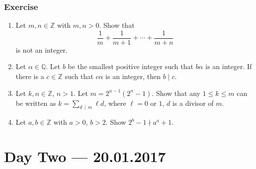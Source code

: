 \documentclass{amsbook}
\theoremstyle{plain}
\theoremstyle{definition}
\theoremstyle{remark}
\numberwithin{equation}{chapter}
\numberwithin{figure}{chapter}
\newcommand{\Q}{\mathbb{Q}}
\newcommand{\Z}{\mathbb{Z}}
\begin{document}
\subsection*{Exercise}
\begin{enumerate}
\item Let $m, n \in \Z$ with $m, n > 0$. Show that
  \[
    \frac{1}m + \frac{1}{m+1} + \cdots + \frac{1}{m+n}
  \]
  is not an integer.
\item Let $\alpha \in \Q$. Let $b$ be the smallest positive integer such that $b \alpha$ is an integer. If there is a $c \in \Z$ such that $c \alpha$ is an integer, then $b \mid c$.
\item Let $k, n \in \Z$, $n > 1$. Let $m = 2^{n - 1}(2^n - 1)$. Show that any $1 \leqslant k \leqslant m$ can be written as $k = \sum_{d \, \mid \, m} \ell d$, where $\ell = 0 \text{ or } 1$, $d$ is a divisor of $m$.
\item Let $a, b \in \Z$ with $a > 0$, $b > 2$. Show $2^b - 1 \nmid a^a + 1$.
\end{enumerate}

\chapter[Lecture Two]{Day Two \hfill {\footnotesize \rm --- 20.01.2017}}
\end{document}
